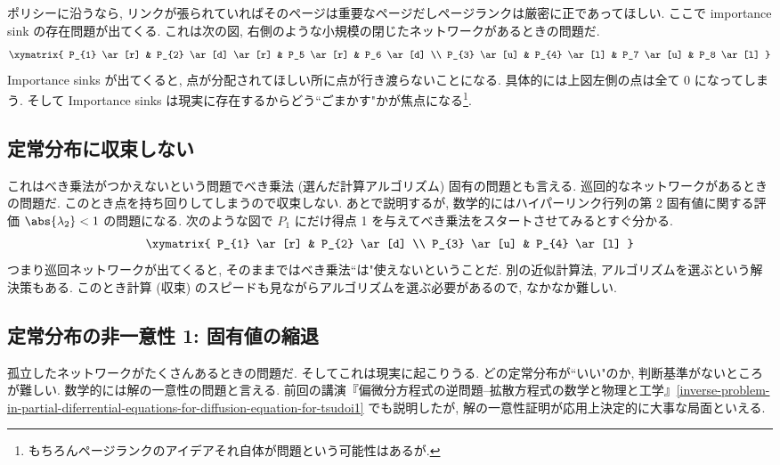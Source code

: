 \documentclass[openany, a4paper, oneside]{jsbook}
\begin{document}
ポリシーに沿うなら, リンクが張られていればそのページは重要なページだしページランクは厳密に正であってほしい.
ここで importance sink の存在問題が出てくる.
これは次の図, 右側のような小規模の閉じたネットワークがあるときの問題だ.
\begin{align}
 \xymatrix{
  P_{1} \ar[r] & P_{2} \ar[d] \ar[r] & P_5 \ar[r] & P_6 \ar[d] \\
  P_{3} \ar[u] & P_{4} \ar[l]        & P_7 \ar[u] & P_8 \ar[l]
 }
\end{align}
Importance sinks が出てくると, 点が分配されてほしい所に点が行き渡らないことになる.
具体的には上図左側の点は全て 0 になってしまう.
そして Importance sinks は現実に存在するからどう``ごまかす"かが焦点になる\footnote{もちろんページランクのアイデアそれ自体が問題という可能性はあるが.}.


\subsection{定常分布に収束しない}

これはべき乗法がつかえないという問題でべき乗法 (選んだ計算アルゴリズム) 固有の問題とも言える.
巡回的なネットワークがあるときの問題だ.
このとき点を持ち回りしてしまうので収束しない.
あとで説明するが, 数学的にはハイパーリンク行列の第 2 固有値に関する評価 $\abs{\lambda_2} < 1$ の問題になる.
次のような図で $P_1$ にだけ得点 1 を与えてべき乗法をスタートさせてみるとすぐ分かる.
\begin{align}
 \xymatrix{
  P_{1} \ar[r] & P_{2} \ar[d] \\
  P_{3} \ar[u] & P_{4} \ar[l]
 }
\end{align}
つまり巡回ネットワークが出てくると, そのままではべき乗法``は"使えないということだ.
別の近似計算法, アルゴリズムを選ぶという解決策もある.
このとき計算 (収束) のスピードも見ながらアルゴリズムを選ぶ必要があるので, なかなか難しい.
\subsection{定常分布の非一意性 1: 固有値の縮退}

孤立したネットワークがたくさんあるときの問題だ.
そしてこれは現実に起こりうる.
どの定常分布が``いい"のか, 判断基準がないところが難しい.
数学的には解の一意性の問題と言える.
前回の講演『偏微分方程式の逆問題--拡散方程式の数学と物理と工学』\ref{inverse-problem-in-partial-diferrential-equations-for-diffusion-equation-for-tsudoi1} でも説明したが,
解の一意性証明が応用上決定的に大事な局面といえる.
\end{document}
